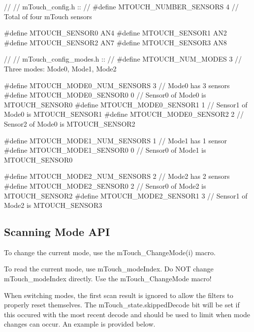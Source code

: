 \begin{DoxyCode}
\textcolor{comment}{//}
\textcolor{comment}{// mTouch\_config.h        ::}
\textcolor{comment}{//}
\textcolor{preprocessor}{#define MTOUCH\_NUMBER\_SENSORS         4   // Total of four mTouch sensors}

\textcolor{preprocessor}{#define MTOUCH\_SENSOR0              AN4        }
\textcolor{preprocessor}{#define MTOUCH\_SENSOR1              AN2            }
\textcolor{preprocessor}{#define MTOUCH\_SENSOR2              AN7    }
\textcolor{preprocessor}{#define MTOUCH\_SENSOR3              AN8  }

\textcolor{comment}{//}
\textcolor{comment}{// mTouch\_config\_modes.h  ::}
\textcolor{comment}{//}
\textcolor{preprocessor}{#define MTOUCH\_NUM\_MODES              3   // Three modes: Mode0, Mode1, Mode2}

\textcolor{preprocessor}{#define MTOUCH\_MODE0\_NUM\_SENSORS      3   // Mode0 has 3 sensors}
\textcolor{preprocessor}{#define MTOUCH\_MODE0\_SENSOR0          0   // Sensor0 of Mode0 is MTOUCH\_SENSOR0}
\textcolor{preprocessor}{#define MTOUCH\_MODE0\_SENSOR1          1   // Sensor1 of Mode0 is MTOUCH\_SENSOR1}
\textcolor{preprocessor}{#define MTOUCH\_MODE0\_SENSOR2          2   // Sensor2 of Mode0 is MTOUCH\_SENSOR2}

\textcolor{preprocessor}{#define MTOUCH\_MODE1\_NUM\_SENSORS      1   // Mode1 has 1 sensor}
\textcolor{preprocessor}{#define MTOUCH\_MODE1\_SENSOR0          0   // Sensor0 of Mode1 is MTOUCH\_SENSOR0}

\textcolor{preprocessor}{#define MTOUCH\_MODE2\_NUM\_SENSORS      2   // Mode2 has 2 sensors}
\textcolor{preprocessor}{#define MTOUCH\_MODE2\_SENSOR0          2   // Sensor0 of Mode2 is MTOUCH\_SENSOR2}
\textcolor{preprocessor}{#define MTOUCH\_MODE2\_SENSOR1          3   // Sensor1 of Mode2 is MTOUCH\_SENSOR3}
\end{DoxyCode}
\hypertarget{feat_mode_featMode-Out}{}\subsection{Scanning Mode A\+P\+I}\label{feat_mode_featMode-Out}
To change the current mode, use the m\+Touch\+\_\+\+Change\+Mode(i) macro.

To read the current mode, use m\+Touch\+\_\+mode\+Index. Do N\+O\+T change m\+Touch\+\_\+mode\+Index directly. Use the m\+Touch\+\_\+\+Change\+Mode macro!

When switching modes, the first scan result is ignored to allow the filters to properly reset themselves. The m\+Touch\+\_\+state.\+skipped\+Decode bit will be set if this occured with the most recent decode and should be used to limit when mode changes can occur. An example is provided below.

